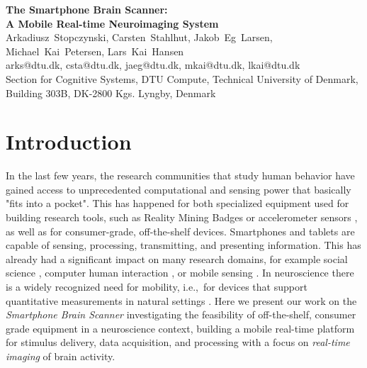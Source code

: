 \documentclass[10pt]{article}
\date{}
\begin{document}
\begin{center}
{\Large
\textbf{The Smartphone Brain Scanner: \\ A Mobile Real-time Neuroimaging System}
}
\\[0.2in]
Arkadiusz~Stopczynski, 
Carsten~Stahlhut, 
Jakob~Eg~Larsen,
Michael~Kai~Petersen,
Lars~Kai~Hansen
\\[0.05in]
arks@dtu.dk, csta@dtu.dk, jaeg@dtu.dk, mkai@dtu.dk, lkai@dtu.dk
\\[0.05in]
Section for Cognitive Systems, DTU Compute, Technical University of Denmark, Building 303B, DK-2800 Kgs. Lyngby, Denmark
\end{center}

\section{Introduction}

In the last few years, the research communities that study human behavior have gained access to unprecedented computational and sensing power that basically "fits into a pocket". This has happened for both specialized equipment used for building research tools, such as Reality Mining Badges \cite{choudhury2003sensing} or accelerometer sensors \cite{van2000shall}, as well as for consumer-grade, off-the-shelf devices. Smartphones and tablets are capable of sensing, processing, transmitting, and presenting information. This has already had a significant impact on many research domains, for example social science \cite{aharony2011social}, computer human interaction \cite{brown2011into}, or mobile sensing \cite{jensen2010estimating,kwok2009personal}. In neuroscience there is a widely recognized need for mobility, i.e.,~for  devices that support quantitative measurements in natural settings  \cite{makeig2009linking,blankertz2010berlin,gramann2011cognition}. Here we present our work on the \emph{Smartphone Brain Scanner} investigating the feasibility of off-the-shelf, consumer grade equipment in a neuroscience context, building a mobile real-time platform for stimulus delivery, data acquisition, and processing with a focus on \emph{real-time imaging} of brain activity.
\end{document}
